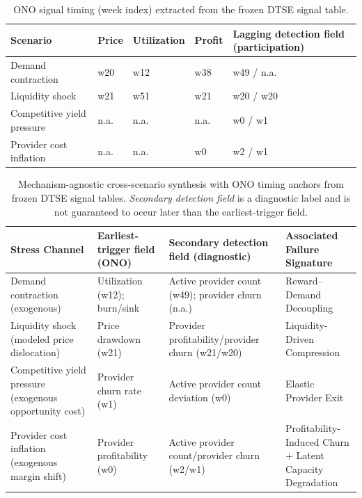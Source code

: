 \begin{table}[htbp]
\centering
\footnotesize
\setlength{\tabcolsep}{3pt}
\begin{tabular}{@{}
  >{\raggedright\arraybackslash}p{}
  >{\centering\arraybackslash}p{}
  >{\centering\arraybackslash}p{}
  >{\centering\arraybackslash}p{}
  >{\centering\arraybackslash}p{}
@{}}
\toprule
\textbf{Scenario} & \textbf{Price} & \textbf{Utilization} & \textbf{Profit} & \textbf{Lagging detection field (participation)} \\
\midrule
Demand contraction & w20 & w12 & w38 & w49 / n.a. \\
Liquidity shock & w21 & w51 & w21 & w20 / w20 \\
Competitive yield pressure & n.a. & n.a. & n.a. & w0 / w1 \\
Provider cost inflation & n.a. & n.a. & w0 & w2 / w1 \\
\bottomrule
\end{tabular}
\caption{ONO signal timing (week index) extracted from the frozen DTSE signal table.}
\label{tab:dtse_signal_timing_ono}
\end{table}

\begin{table}[htbp]
\centering
\footnotesize
\setlength{\tabcolsep}{3pt}
\renewcommand{\arraystretch}{1.2}
\begin{tabularx}{\textwidth}{@{}
  >{\raggedright\arraybackslash}p{}
  >{\raggedright\arraybackslash}p{}
  >{\raggedright\arraybackslash}p{}
  >{\raggedright\arraybackslash}X
@{}}
\toprule
\textbf{Stress Channel} &
\textbf{Earliest-trigger field (ONO)} &
\textbf{Secondary detection field (diagnostic)} &
\textbf{Associated Failure Signature} \\
\midrule
Demand contraction (exogenous) &
Utilization (w12); burn/sink &
Active provider count (w49); provider churn (n.a.) &
Reward--Demand Decoupling \\
\addlinespace
Liquidity shock (modeled price dislocation) &
Price drawdown (w21) &
Provider profitability/provider churn (w21/w20) &
Liquidity-Driven Compression \\
\addlinespace
Competitive yield pressure (exogenous opportunity cost) &
Provider churn rate (w1) &
Active provider count deviation (w0) &
Elastic Provider Exit \\
\addlinespace
Provider cost inflation (exogenous margin shift) &
Provider profitability (w0) &
Active provider count/provider churn (w2/w1) &
\shortstack[l]{Profitability-Induced Churn\\+ Latent Capacity Degradation} \\
\bottomrule
\end{tabularx}
\caption{Mechanism-agnostic cross-scenario synthesis with ONO timing anchors from frozen DTSE signal tables. \emph{Secondary detection field} is a diagnostic label and is not guaranteed to occur later than the earliest-trigger field.}
\label{tab:dtse_cross_scenario_synthesis}
\end{table}

